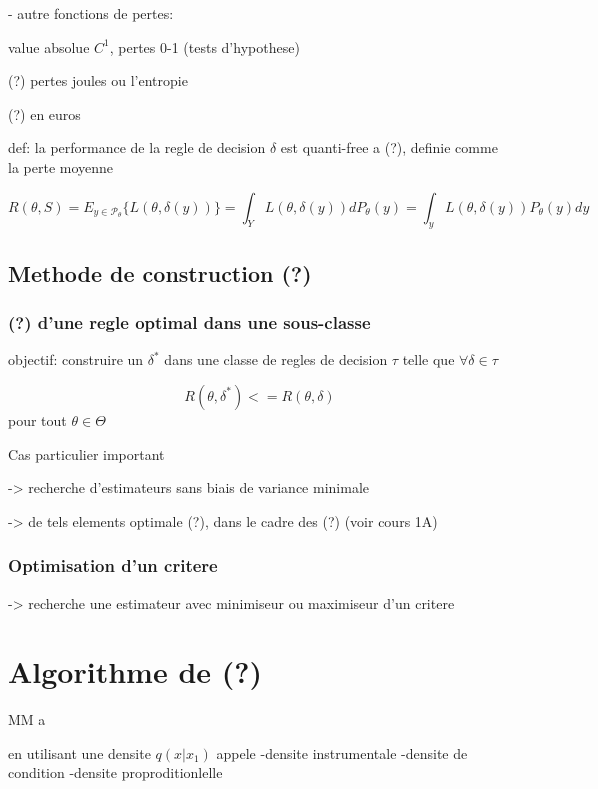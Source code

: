 \documentclass{article}
\begin{document}
- autre fonctions de pertes:

value absolue $C^1$, pertes 0-1 (tests d'hypothese)

(?) pertes joules ou l'entropie

(?) en euros

def: la performance de la regle de decision $\delta$ est quanti-free a (?), definie comme la perte moyenne

\begin{equation}
	R(\theta,S) = E_{y\in \mathscr{P}_\theta} \{L(\theta, \delta(y))\} = \int_Y L(\theta,\delta(y))d P_\theta(y)=\int_y L(\theta,\delta(y))P_\theta(y)dy
\end{equation}

\subsection{Methode de construction (?)}
\subsubsection{(?) d'une regle optimal dans une sous-classe}

objectif: construire un $\delta^*$ dans une classe de regles de decision $\tau$ telle que $\forall \delta \in \tau$

\begin{equation}
	R(\theta,\delta^*)<=R(\theta,\delta)
\end{equation}
pour tout $\theta\in\Theta$

Cas particulier important

-> recherche d'estimateurs sans biais de variance minimale

-> de tels elements optimale (?), dans le cadre des (?) (voir cours 1A)

\subsubsection{Optimisation d'un critere}

-> recherche une estimateur avec minimiseur ou maximiseur d'un critere


\section{Algorithme de (?)}

MM a 

en utilisant une densite $q(x|x_1)$ appele 
-densite instrumentale
-densite de condition
-densite proproditionlelle
\end{document}
